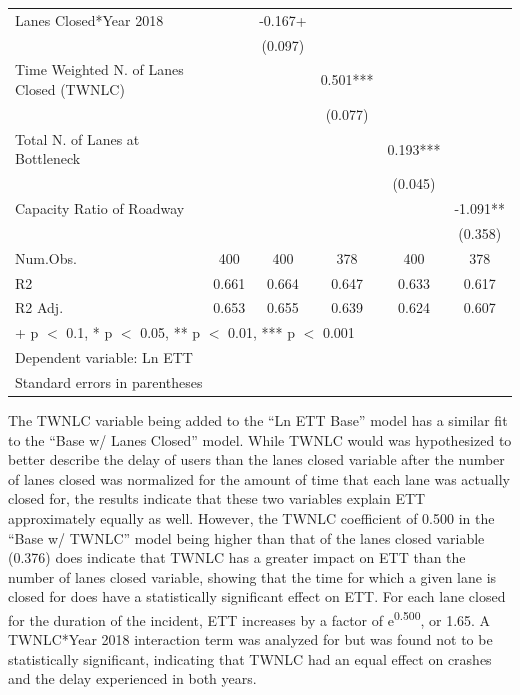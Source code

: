 \documentclass[
  letterpaper,
  authoryear]{elsarticle}
\begin{document}
\begin{table}
{\begin{tabular}[t]{lccccc}
Lanes Closed*Year 2018 &  & -0.167+ &  &  & \\
 &  & (0.097) &  &  & \\
Time Weighted N. of Lanes Closed (TWNLC) &  &  & 0.501*** &  & \\
 &  &  & (0.077) &  & \\
Total N. of Lanes at Bottleneck &  &  &  & 0.193*** & \\
 &  &  &  & (0.045) & \\
Capacity Ratio of Roadway &  &  &  &  & -1.091**\\
 &  &  &  &  & (0.358)\\
\midrule
Num.Obs. & 400 & 400 & 378 & 400 & 378\\
R2 & 0.661 & 0.664 & 0.647 & 0.633 & 0.617\\
R2 Adj. & 0.653 & 0.655 & 0.639 & 0.624 & 0.607\\
\bottomrule
\multicolumn{6}{l}{\rule{0pt}{1em}+ p $<$ 0.1, * p $<$ 0.05, ** p $<$ 0.01, *** p $<$ 0.001}\\
\multicolumn{6}{l}{\rule{0pt}{1em}Dependent variable: Ln ETT}\\
\multicolumn{6}{l}{\rule{0pt}{1em}Standard errors in parentheses}\\
\end{tabular}

}

\end{table}%

The TWNLC variable being added to the ``Ln ETT Base'' model has a
similar fit to the ``Base w/ Lanes Closed'' model. While TWNLC would was
hypothesized to better describe the delay of users than the lanes closed
variable after the number of lanes closed was normalized for the amount
of time that each lane was actually closed for, the results indicate
that these two variables explain ETT approximately equally as well.
However, the TWNLC coefficient of 0.500 in the ``Base w/ TWNLC'' model
being higher than that of the lanes closed variable (0.376) does
indicate that TWNLC has a greater impact on ETT than the number of lanes
closed variable, showing that the time for which a given lane is closed
for does have a statistically significant effect on ETT. For each lane
closed for the duration of the incident, ETT increases by a factor of
e\textsuperscript{0.500}, or 1.65. A TWNLC*Year 2018 interaction term
was analyzed for but was found not to be statistically significant,
indicating that TWNLC had an equal effect on crashes and the delay
experienced in both years.
\end{document}
